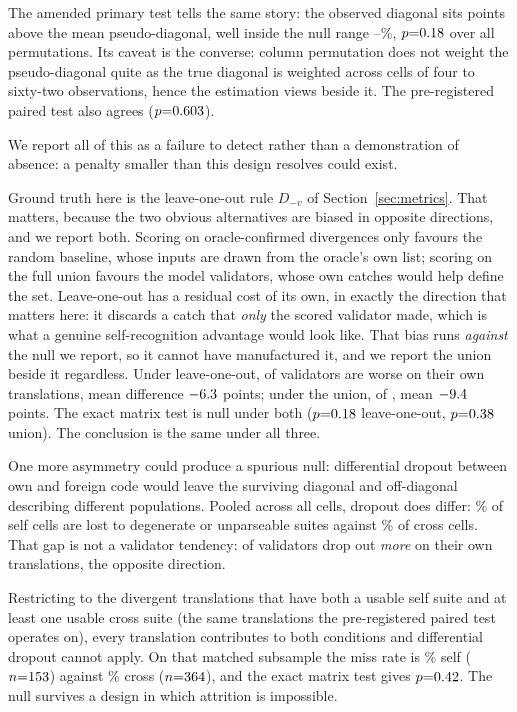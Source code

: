 \documentclass[sigconf]{acmart}
\begin{document}
The amended primary test tells the same story: the observed diagonal sits \DiagDiff{}
points above the mean pseudo-diagonal, well inside the null range \DiagNullLo--\DiagNullHi\%,
$p{=}0.18$ over all \DiagPerms{} permutations. Its caveat is the converse: column permutation does not weight the pseudo-diagonal quite as
the true diagonal is weighted across cells of four to sixty-two observations, hence the
estimation views beside it. The pre-registered paired test also agrees ($p{=}0.603$).

We report all of this as a failure to detect rather than a demonstration of absence: a penalty
smaller than this design resolves could exist.

Ground truth here is the leave-one-out rule $D_{-v}$ of Section~\ref{sec:metrics}. That
matters, because the two obvious alternatives are biased in opposite directions, and we report
both. Scoring on
oracle-confirmed divergences only favours the random baseline, whose inputs are drawn from the
oracle's own list; scoring on the full union favours the model validators, whose own catches
would help define the set. Leave-one-out has a residual cost of its own, in exactly the direction
that matters here: it discards a catch that \emph{only} the scored validator made, which is what
a genuine self-recognition advantage would look like. That bias runs \emph{against} the null we
report, so it cannot have manufactured it, and we report the union beside it regardless. Under
leave-one-out, \WVWorseOnOwn{} of \WVValidators{} validators are worse on their own translations,
mean difference $-6.3$ points; under the union, \WVWorseOnOwnUnion{} of \WVValidators{},
mean $-9.4$ points. The exact matrix test is null under both
($p{=}0.18$ leave-one-out, $p{=}0.38{}$ union). The conclusion is the same under all three.

One more asymmetry could produce a spurious null: differential dropout between own and foreign
code would leave the surviving diagonal and off-diagonal describing different populations. Pooled across all cells, dropout does differ: \DropSelf\% of self cells are lost to degenerate
or unparseable suites against \DropCross\% of cross cells. That gap is not a validator tendency:
\DropWorseSelfN{} of \DropValidatorsChecked{} validators drop out \emph{more} on their own
translations, the opposite direction.

Restricting to the
\MatchTrans{} divergent translations that have both a usable self suite and at least one usable
cross suite (the same translations the pre-registered paired test operates on), every
translation contributes to both conditions and differential dropout cannot apply. On that matched subsample the miss rate is \MatchSelfMiss\% self ($n{=}153$)
against \MatchCrossMiss\% cross ($n{=}364$), and the exact matrix test gives
$p{=}0.42$. The null survives a design in which attrition is impossible.
\end{document}
